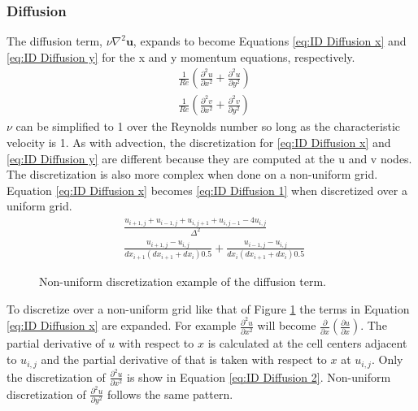 \documentclass[onehalf,11pt]{beavtex}
\begin{document}
\subsubsection{Diffusion}
\label{sec:NS ID Diffusion}
The diffusion term, $\nu \nabla^2 \textbf{u}$, expands to become Equations \eqref{eq:ID Diffusion x} and \eqref{eq:ID Diffusion y} for the x and y momentum equations, respectively.
\begin{align}
& \frac{1}{Re}\left(\frac{\partial^2 u}{\partial x^2} + \frac{\partial^2 u}{\partial y^2}\right)\label{eq:ID Diffusion x} \\
& \frac{1}{Re}\left(\frac{\partial^2 v}{\partial x^2} + \frac{\partial^2 v}{\partial y^2}\right)\; \label{eq:ID Diffusion y}
\end{align}
$\nu$ can be simplified to 1 over the Reynolds number so long as the characteristic velocity is 1. 
As with advection, the discretization for \eqref{eq:ID Diffusion x} and \eqref{eq:ID Diffusion y} are different because they are computed at the u and v nodes.
The discretization is also more complex when done on a non-uniform grid.
Equation \eqref{eq:ID Diffusion x} becomes \eqref{eq:ID Diffusion 1} when discretized over a uniform grid. 
\begin{align}
&\frac{u_{i+1,j} + u_{i-1,j} + u_{i,j+1} + u_{i,j-1} - 4u_{i,j}}{\Delta^2}\label{eq:ID Diffusion 1} \\
&\frac{u_{i+1,j} - u_{i,j}}{dx_{i+1}(dx_{i+1}+dx_i)0.5} + \frac{u_{i-1,j} - u_{i,j}}{dx_{i}(dx_{i+1}+dx_i)0.5} \; \label{eq:ID Diffusion 2}
\end{align}
\begin{figure}[!htb]
	\centering
	
	\caption{Non-uniform discretization example of the diffusion term.}
	\label{fig:ID diffusion}
\end{figure}
To discretize over a non-uniform grid like that of Figure \ref{fig:ID diffusion} the terms in Equation \eqref{eq:ID Diffusion x} are expanded. 
For example $\frac{\partial^2 u}{\partial x^2}$ will become $\frac{\partial}{\partial x}\left(\frac{\partial u}{\partial x}\right)$. 
The partial derivative of $u$ with respect to $x$ is calculated at the cell centers adjacent to $u_{i,j}$ and the partial derivative of that is taken with respect to $x$ at $u_{i,j}.$
Only the discretization of $\frac{\partial^2 u}{\partial x^2}$ is show in Equation \eqref{eq:ID Diffusion 2}. 
Non-uniform discretization of $\frac{\partial^2 u}{\partial y^2}$ follows the same pattern. 
\end{document}
